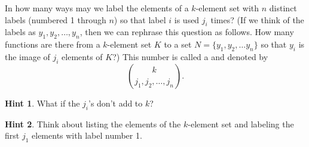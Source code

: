 \documentclass{book}
\begin{document}
\setcounter{cpjt}{281}
\addtocounter{cpjt}{-1}
\begin{activity}\label{activity-274}
\hypertarget{p-1427}{}%
In how many ways may we label the elements of a \(k\)-element set with \(n\) distinct labels (numbered 1 through \(n\)) so that label \(i\) is used \(j_i\) times? (If we think of the labels as \(y_1, y_2, \ldots, y_n\), then we can rephrase this question as follows.  How many functions are there from a \(k\)-element set \(K\) to a set \(N=\{y_1,y_2,\ldots y_n\}\) so that \(y_i\) is the image of \(j_i\) elements of \(K\)?) This number is called a  and denoted by%
\begin{equation*}
\binom{k}{j_1,j_2,\ldots, j_n}.
\end{equation*}
%
\par\smallskip%
\noindent\textbf{Hint 1}.\hypertarget{hint-182}{}\quad%
\hypertarget{p-1428}{}%
What if the \(j_i\)'s don't add to \(k\)?%
\par\smallskip%
\noindent\textbf{Hint 2}.\hypertarget{hint-183}{}\quad%
\hypertarget{p-1429}{}%
Think about listing the elements of the \(k\)-element set and labeling the first \(j_1\) elements with label number 1.%
\par\smallskip%
\noindent\end{activity}

\clearpage
\end{document}
